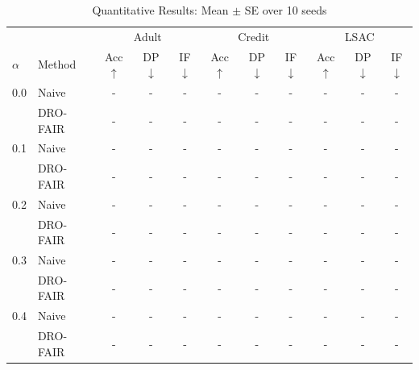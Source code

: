 \begin{table}[h]
\centering
\caption{Quantitative Results: Mean $\pm$ SE over 10 seeds}
\label{tab:main_results}
\begin{tabular}{ll|ccc|ccc|ccc}
\toprule
& & \multicolumn{3}{c|}{Adult} & \multicolumn{3}{c|}{Credit} & \multicolumn{3}{c}{LSAC} \\
$\alpha$ & Method & Acc$\uparrow$ & DP$\downarrow$ & IF$\downarrow$ & Acc$\uparrow$ & DP$\downarrow$ & IF$\downarrow$ & Acc$\uparrow$ & DP$\downarrow$ & IF$\downarrow$ \\
\midrule
0.0 & Naive & - & - & - & - & - & - & - & - & - \\
 & DRO-FAIR & - & - & - & - & - & - & - & - & - \\
\midrule
0.1 & Naive & - & - & - & - & - & - & - & - & - \\
 & DRO-FAIR & - & - & - & - & - & - & - & - & - \\
\midrule
0.2 & Naive & - & - & - & - & - & - & - & - & - \\
 & DRO-FAIR & - & - & - & - & - & - & - & - & - \\
\midrule
0.3 & Naive & - & - & - & - & - & - & - & - & - \\
 & DRO-FAIR & - & - & - & - & - & - & - & - & - \\
\midrule
0.4 & Naive & - & - & - & - & - & - & - & - & - \\
 & DRO-FAIR & - & - & - & - & - & - & - & - & - \\
\bottomrule
\end{tabular}
\end{table}